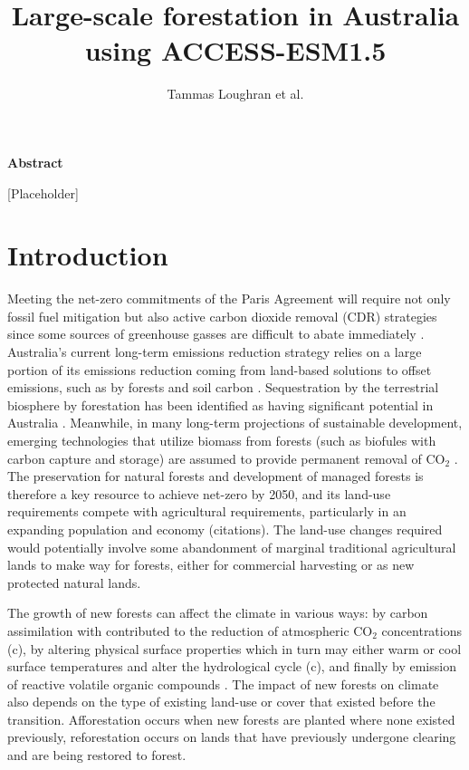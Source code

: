\documentclass[]{article}
\title{Large-scale forestation in Australia using ACCESS-ESM1.5}
\author{Tammas Loughran et al.}
\begin{document}
\maketitle

\begin{center}
    \Large
    \vspace{0.9cm}
    \textbf{Abstract}
\end{center}

[Placeholder]

\raggedright
\parindent=0.35in %

\section{Introduction}

Meeting the net-zero commitments of the Paris Agreement will require not only fossil fuel mitigation but also active carbon dioxide removal (CDR) strategies since some sources of greenhouse gasses are difficult to abate immediately \parencite{van_vuuren_rcp26_2011, vaughan_review_2011, rogelj_emission_2011}.
Australia's current long-term emissions reduction strategy relies on a large portion of its emissions reduction coming from land-based solutions to offset emissions, such as by forests and soil carbon \parencite{smith_longterm_2022, australian_government_2021}.
Sequestration by the terrestrial biosphere by forestation has been identified as having significant potential in Australia \parencite{fitch_australias_2022}.
Meanwhile, in many long-term projections of sustainable development, emerging technologies that utilize biomass from forests (such as biofules with carbon capture and storage) are assumed to provide permanent removal of CO$_2$ \parencite{pour_opportunities_2018}.
The preservation for natural forests and development of managed forests is therefore a key resource to achieve net-zero by 2050, and its land-use requirements compete with agricultural requirements, particularly in an expanding population and economy (citations).
The land-use changes required would potentially involve some abandonment of marginal traditional agricultural lands to make way for forests, either for commercial harvesting or as new protected natural lands.

The growth of new forests can affect the climate in various ways: by carbon assimilation with contributed to the reduction of atmospheric CO$_2$ concentrations (c), by altering physical surface properties which in turn may either warm or cool surface temperatures and alter the hydrological cycle (c), and finally by emission of reactive volatile organic compounds \parencite{weber_chemistry_albedo_2024}. The impact of new forests on climate also depends on the type of existing land-use or cover that existed before the transition. Afforestation occurs when new forests are planted where none existed previously, reforestation occurs on lands that have previously undergone clearing and are being restored to forest.
\end{document}
